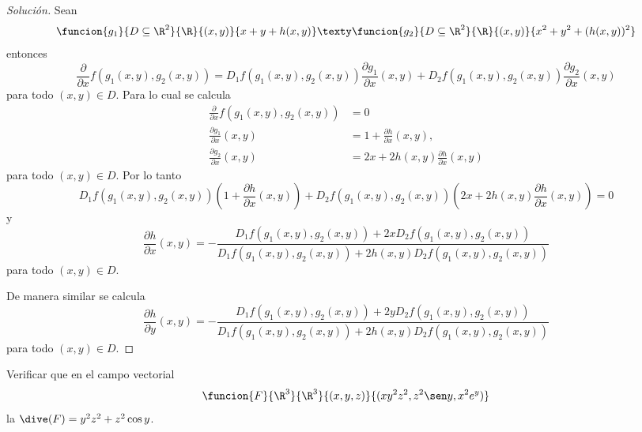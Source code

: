 \documentclass[a4,11pt]{aleph-notas}
\begin{document}
\begin{proof}[Solución]
Sean
    \[
    \funcion{g_1}{D \subseteq \R^2}{\R}{(x,y)}{x+y+h(x,y)}  \texty  \funcion{g_2}{D \subseteq \R^2}{\R}{(x,y)}{x^2+y^2+(h(x,y))^2}
    \]
    entonces
    \[
    \frac{\partial}{\partial x}f(g_1(x,y),g_2(x,y))=D_1f(g_1(x,y),g_2(x,y))\frac{\partial g_1}{\partial x}(x,y)+D_2f(g_1(x,y),g_2(x,y))\frac{\partial g_2}{\partial x}(x,y)
    \]
    para todo $(x,y) \in D$. Para lo cual se calcula  
    \begin{align*}
    \frac{\partial}{\partial x}f(g_1(x,y),g_2(x,y))&=0\\
    \frac{\partial g_1}{\partial x}(x,y)&=1+\frac{\partial h}{\partial x}(x,y),\\
    \frac{\partial g_2}{\partial x}(x,y)&=2x+2h(x,y) \frac{\partial h}{\partial x}(x,y)
    \end{align*}
    para todo $(x,y) \in D$. Por lo tanto
    \[
    D_1f(g_1(x,y),g_2(x,y))\left(1+\frac{\partial h}{\partial x}(x,y)\right)+D_2f(g_1(x,y),g_2(x,y))\left(2x+2h(x,y) \frac{\partial h}{\partial x}(x,y)\right)=0
    \]
    y
    \[
    \frac{\partial h}{\partial x}(x,y)=-\frac{D_1f(g_1(x,y),g_2(x,y))+2xD_2f(g_1(x,y),g_2(x,y))}{D_1f(g_1(x,y),g_2(x,y))+2h(x,y)D_2f(g_1(x,y),g_2(x,y))}
    \]
    para todo $(x,y) \in D$. 
    
    De manera similar se calcula
    \[
    \frac{\partial h}{\partial y}(x,y)=-\frac{D_1f(g_1(x,y),g_2(x,y))+2yD_2f(g_1(x,y),g_2(x,y))}{D_1f(g_1(x,y),g_2(x,y))+2h(x,y)D_2f(g_1(x,y),g_2(x,y))}
    \]
    para todo $(x,y) \in D$.
\end{proof}

\begin{ejer}
Verificar que en el campo vectorial
    \[
    \funcion{F}{\R^3}{\R^3}{(x,y,z)}{(xy^2z^2,z^2\sen y,x^2e^y)}
    \]
    la $\dive(F)=y^2z^2+z^2 \cos y$.
\end{ejer}
\end{document}

